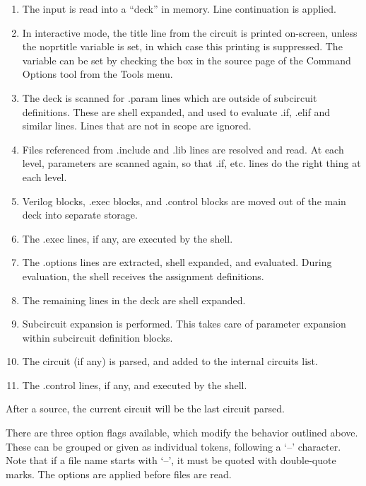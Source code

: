 \begin{enumerate}
\item{The input is read into a ``deck'' in memory.  Line continuation
is applied.}

\item{In interactive mode, the title line from the circuit is printed
on-screen, unless the {\et noprtitle} variable is set, in which case
this printing is suppressed.  The variable can be set by checking the
box in the {\cb source} page of the {\cb Command Options} tool from
the {\cb Tools} menu.}

\item{The deck is scanned for {\vt .param} lines which are outside of
subcircuit definitions.  These are shell expanded, and used to
evaluate {\vt .if}, {\vt .elif} and similar lines.  Lines that are not
in scope are ignored.}

\item{Files referenced from {\vt .include} and {\vt .lib} lines are
resolved and read.  At each level, parameters are scanned again, so
that {\vt .if}, etc.  lines do the right thing at each level.}

\item{Verilog blocks, {\vt .exec} blocks, and {\vt .control} blocks
are moved out of the main deck into separate storage.}

\item{The {\vt .exec} lines, if any, are executed by the shell.}

\item{The {\vt .options} lines are extracted, shell expanded, and
evaluated.  During evaluation, the shell receives the assignment
definitions.}

\item{The remaining lines in the deck are shell expanded.}

\item{Subcircuit expansion is performed.  This takes care of parameter
expansion within subcircuit definition blocks.}

\item{The circuit (if any) is parsed, and added to the internal
circuits list.}

\item{The {\vt .control} lines, if any, and executed by the shell.}
\end{enumerate}

After a {\cb source}, the current circuit will be the last circuit
parsed.

There are three option flags available, which modify the behavior
outlined above.  These can be grouped or given as individual tokens,
following a `--' character.  Note that if a file name starts with
`--', it must be quoted with double-quote marks.  The options are
applied before files are read.


